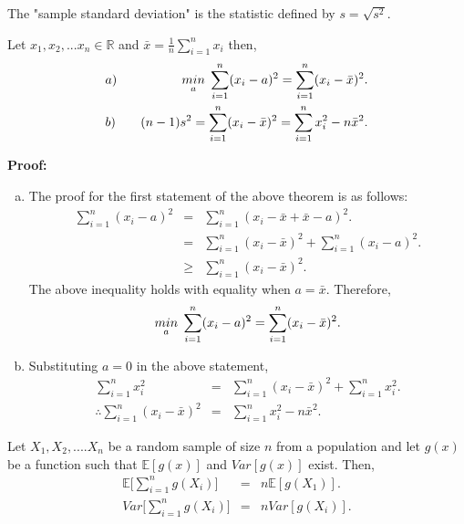 \documentclass[a4paper,english,12pt]{article}
\begin{document}
\begin{defn}
The "sample standard deviation" is the statistic defined by $s = \sqrt{s^2}$.
\end{defn}

\begin{thm}
Let $x_1, x_2,...x_n  \in \mathbb{R}$ and $\bar{x} = \frac{1}{n} \displaystyle \sum_{i=1}^{n} x_i$ then,\\
\begin{eqnarray}
&a)& \hspace{0.3cm} \underset{a}{min} \hspace{0.1cm} \sum_{i=1}^{n} (x_i - a)^2 = \sum_{i=1}^{n} (x_i - \bar{x})^2. \\
&b)& \hspace{0.3cm} (n-1)s^2 = \sum_{i=1}^{n} (x_i - \bar{x})^2 = \sum_{i=1}^{n} x_i^2 - n\bar{x}^2.
\end{eqnarray}
\end{thm}

\textbf{Proof:}
\begin{enumerate}[a)]
\item{ 
The proof for the first statement of the above theorem is as follows:
\begin{eqnarray}
\sum_{i=1}^{n} (x_i - a)^2 &=& \sum_{i=1}^{n} (x_i - \bar{x} + \bar{x} - a)^2. \nonumber \\
&=& \sum_{i=1}^{n} (x_i - \bar{x})^2 + \sum_{i=1}^{n} (x_i - a)^2.  \\
&\geq& \sum_{i=1}^{n} (x_i - \bar{x})^2.
\end{eqnarray}
The above inequality holds with equality when $a = \bar{x}$. Therefore,
\begin{equation}
 \underset{a}{min} \hspace{0.1cm} \sum_{i=1}^{n} (x_i - a)^2 = \sum_{i=1}^{n} (x_i - \bar{x})^2.
\end{equation}
}
\item{
Substituting $a = 0$ in the above statement,
\begin{eqnarray}
\sum_{i=1}^{n} x_i^2 &=& \sum_{i=1}^{n} (x_i - \bar{x})^2 + \sum_{i=1}^{n} x_i^2.  \nonumber \\
\therefore \sum_{i=1}^{n} (x_i - \bar{x})^2 &=& \sum_{i=1}^{n} x_i^2 - n \bar{x}^2.
\end{eqnarray}
}
\end{enumerate}
\begin{lem}
Let $X_1, X_2, .... X_n$ be a random sample of size $n$ from a population and let $g(x)$ be a function such that $\mathbb{E}[g(x)]$ and $Var[g(x)]$ exist. Then,
\begin{eqnarray}
\mathbb{E}\Big[ \sum_{i=1}^{n} g(X_i) \Big] &=& n \mathbb{E}[g(X_1)].\\
Var \Big[ \sum_{i=1}^{n} g(X_i) \Big] &=& n Var[g(X_i)].
\end{eqnarray}
\end{lem}
\end{document}
